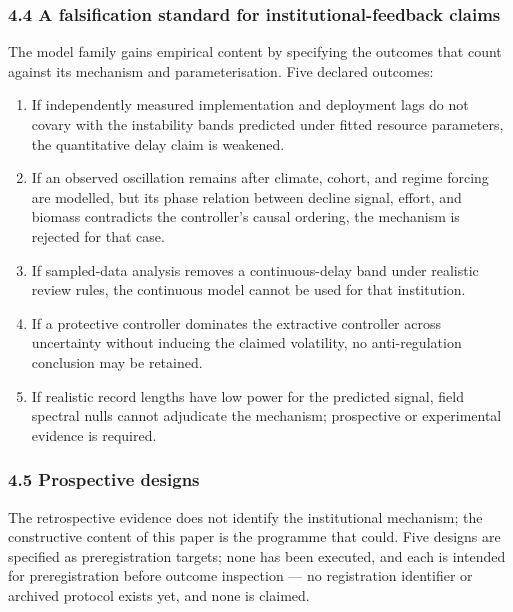 \documentclass[11pt]{article}
\providecommand{\tightlist}{\setlength{\itemsep}{0pt}\setlength{\parskip}{0pt}}
\begin{document}
\subsubsection{4.4 A falsification standard for institutional-feedback
claims}\label{a-falsification-standard-for-institutional-feedback-claims}

The model family gains empirical content by specifying the outcomes that
count against its mechanism and parameterisation. Five declared
outcomes:

\begin{enumerate}
\def\labelenumi{\arabic{enumi}.}
\tightlist
\item
  If independently measured implementation and deployment lags do not
  covary with the instability bands predicted under fitted resource
  parameters, the quantitative delay claim is weakened.
\item
  If an observed oscillation remains after climate, cohort, and regime
  forcing are modelled, but its phase relation between decline signal,
  effort, and biomass contradicts the controller's causal ordering, the
  mechanism is rejected for that case.
\item
  If sampled-data analysis removes a continuous-delay band under
  realistic review rules, the continuous model cannot be used for that
  institution.
\item
  If a protective controller dominates the extractive controller across
  uncertainty without inducing the claimed volatility, no
  anti-regulation conclusion may be retained.
\item
  If realistic record lengths have low power for the predicted signal,
  field spectral nulls cannot adjudicate the mechanism; prospective or
  experimental evidence is required.
\end{enumerate}

\subsubsection{4.5 Prospective designs}\label{prospective-designs}

The retrospective evidence does not identify the institutional
mechanism; the constructive content of this paper is the programme that
could. Five designs are specified as preregistration targets; none has
been executed, and each is intended for preregistration before outcome
inspection --- no registration identifier or archived protocol exists
yet, and none is claimed.
\end{document}
